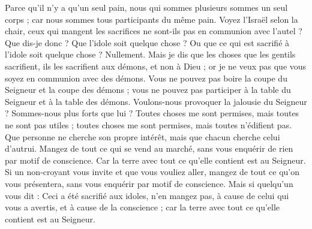 \begin{multicols}{2}
Parce qu'il n'y a qu'un seul pain, nous qui sommes plusieurs sommes un seul corps ; car nous sommes tous participants du même pain.
Voyez l'Israël selon la chair, ceux qui mangent les sacrifices ne sont-ils pas en communion avec l'autel ?
Que dis-je donc ? Que l'idole soit quelque chose ? Ou que ce qui est sacrifié à l'idole soit quelque chose ? Nullement.
Mais je dis que les choses que les gentils sacrifient, ils les sacrifient aux démons, et non à Dieu ; or je ne veux pas que vous soyez en communion avec des démons.
Vous ne pouvez pas boire la coupe du Seigneur et la coupe des démons ; vous ne pouvez pas participer à la table du Seigneur et à la table des démons.
Voulons-nous provoquer la jalousie du Seigneur ? Sommes-nous plus forts que lui ?
Toutes choses me sont permises, mais toutes ne sont pas utiles ; toutes choses me sont permises, mais toutes n'édifient pas.
Que personne ne cherche son propre intérêt, mais que chacun cherche celui d’autrui.
Mangez de tout ce qui se vend au marché, sans vous enquérir de rien par motif de conscience.
Car la terre avec tout ce qu'elle contient est au Seigneur.
Si un non-croyant vous invite et que vous vouliez aller, mangez de tout ce qu’on vous présentera, sans vous enquérir par motif de conscience.
Mais si quelqu'un vous dit : Ceci a été sacrifié aux idoles, n'en mangez pas, à cause de celui qui vous a avertis, et à cause de la conscience ; car la terre avec tout ce qu'elle contient est au Seigneur.

\end{multicols}
